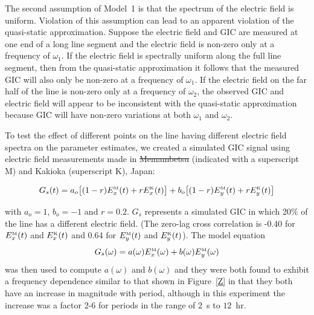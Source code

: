 \documentclass[draft,linenumbers]{agujournal2018}
\providecommand{\DIFaddtex}[1]{{\protect\color{blue}\uwave{#1}}} %
\providecommand{\DIFdeltex}[1]{{\protect\color{red}\sout{#1}}}                      %
\providecommand{\DIFaddbegin}{} %
\providecommand{\DIFaddend}{} %
\providecommand{\DIFdelbegin}{} %
\providecommand{\DIFdelend}{} %
\providecommand{\DIFadd}[1]{\texorpdfstring{\DIFaddtex{#1}}{#1}} %
\providecommand{\DIFdel}[1]{\texorpdfstring{\DIFdeltex{#1}}{}} %
\begin{document}
The second assumption of Model~1 is that the spectrum of the electric field is uniform. Violation of this assumption can lead to an apparent violation of the quasi-static approximation. Suppose the electric field and GIC are measured at one end of a long line segment and the electric field is non-zero only at a frequency of $\omega_1$. If the electric field is spectrally uniform along the full line segment, then from the quasi-static approximation it follows that the measured GIC will also only be non-zero at a frequency of $\omega_1$. If the electric field on the far half of the line is non-zero only at a frequency of $\omega_2$, the observed GIC and electric field will appear to be inconsistent with the quasi-static approximation because GIC will have non-zero variations at both $\omega_1$ and $\omega_2$.

To test the effect of different points on the line having different electric field spectra on the parameter estimates, we created a simulated GIC signal using electric field measurements made in \DIFdelbegin \DIFdel{Memambetsu }\DIFdelend \DIFaddbegin \DIFadd{Memanbetsu }\DIFaddend (indicated with a superscript M) and Kakioka (superscript K), Japan:

\begin{equation}
  G_s(t)=a_o\big[(1-r)E^{\mbox{\tiny M}}_x(t) + rE^{\mbox{\tiny K}}_x(t)\big]+b_o\big[(1-r)E^{\mbox{\tiny M}}_y(t) + rE^{\mbox{\tiny K}}_y(t)\big]
\end{equation}

\noindent
with $a_o=1$, $b_o=-1$ and $r=0.2$. $G_s$ represents a simulated GIC in which 20\% of the line has a different electric field. (The zero-lag cross correlation is -0.40 for $E^{\mbox{\tiny M}}_x(t)$ and $E^{\mbox{\tiny K}}_x(t)$ and 0.64 for $E^{\mbox{\tiny M}}_y(t)$ and $E^{\mbox{\tiny K}}_y(t)$). The model equation
\begin{equation}
  G_s(\omega)=a(\omega)E^{\mbox{\tiny M}}_x(\omega)+b(\omega)E^{\mbox{\tiny M}}_y(\omega)
\end{equation}
\noindent
was then used to compute $a(\omega)$ and $b(\omega)$ and they were both found to exhibit a frequency dependence similar to that shown in Figure~\ref{Z} in that they both have an increase in magnitude with period, although in this experiment the increase was a factor 2-6 for periods in the range of $2$~s to $12$~hr.
\end{document}
